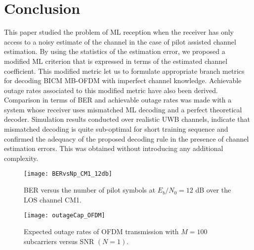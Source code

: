 \documentclass{article}
\begin{document}
\section{Conclusion}
\label{sec:concl}
This paper studied the problem of ML reception when the receiver has only access to a noisy estimate of the channel in the case of pilot assisted channel estimation. 
By using the statistics of the estimation error, we proposed a modified ML criterion that is expressed in terms of the estimated channel coefficient.  
This modified metric let us to formulate appropriate branch metrics for decoding BICM MB-OFDM with imperfect channel knowledge. Achievable outage rates associated to this modified metric have also been derived. Comparison in terms of BER and achievable outage rates was made with a system whose receiver uses mismatched ML decoding and a perfect theoretical decoder. 
Simulation results conducted over realistic UWB channels, indicate that mismatched decoding is quite sub-optimal for short training sequence and confirmed the adequacy of the proposed decoding rule in the presence of channel estimation errors. This was obtained without introducing any additional complexity.         






\begin{figure}[!htb] 
\centering
\texttt{[image: BERvsNp\_CM1\_12db]} 
\caption{BER versus the number of pilot symbols at $E_b/N_0=12$ dB over the LOS channel CM1.}\label{fig5}
\end{figure} 



\begin{figure}[!htb] 
\centering
\texttt{[image: outageCap\_OFDM]} 
\caption{Expected outage rates of OFDM transmission with $M=100$ subcarriers versus SNR $(N=1)$.} \label{fig6}
\end{figure}     
\end{document}
